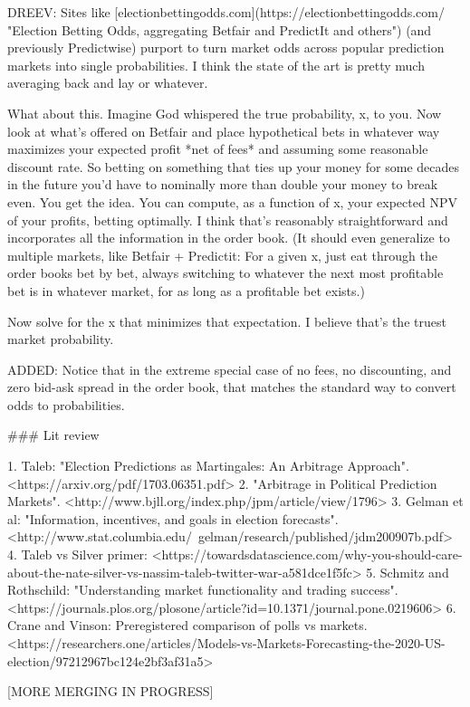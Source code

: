 \documentclass{article}
\begin{document}
\begin{markdown}

DREEV:
Sites like 
[electionbettingodds.com](https://electionbettingodds.com/ "Election Betting Odds, aggregating Betfair and PredictIt and others")
(and previously Predictwise)
purport to turn market odds across popular prediction markets into single probabilities.
I think the state of the art is pretty much averaging back and lay or whatever.

What about this.
Imagine God whispered the true probability, x, to you. 
Now look at what's offered on Betfair and place hypothetical bets in whatever way maximizes your expected profit *net of fees* and assuming some reasonable discount rate. 
So betting on something that ties up your money for some decades in the future you'd have to nominally more than double your money to break even. 
You get the idea. 
You can compute, as a function of x, your expected NPV of your profits, betting optimally. 
I think that's reasonably straightforward and incorporates all the information in the order book. 
(It should even generalize to multiple markets, like Betfair + Predictit: 
For a given x, just eat through the order books bet by bet, always switching to whatever the next most profitable bet is in whatever market, for as long as a profitable bet exists.)

Now solve for the x that minimizes that expectation. 
I believe that's the truest market probability.

ADDED: Notice that in the extreme special case of no fees, no discounting, and zero bid-ask spread in the order book, that matches the standard way to convert odds to probabilities.


### Lit review

1. Taleb: "Election Predictions as Martingales: An Arbitrage Approach".  
<https://arxiv.org/pdf/1703.06351.pdf>
2. "Arbitrage in Political Prediction Markets".   
<http://www.bjll.org/index.php/jpm/article/view/1796>
3. Gelman et al: "Information, incentives, and goals in election forecasts".  
<http://www.stat.columbia.edu/~gelman/research/published/jdm200907b.pdf>
4. Taleb vs Silver primer:  
<https://towardsdatascience.com/why-you-should-care-about-the-nate-silver-vs-nassim-taleb-twitter-war-a581dce1f5fc>
5. Schmitz and Rothschild: "Understanding market functionality and trading success".  
<https://journals.plos.org/plosone/article?id=10.1371/journal.pone.0219606>
6. Crane and Vinson: Preregistered comparison of polls vs markets.
<https://researchers.one/articles/Models-vs-Markets-Forecasting-the-2020-US-election/97212967bc124e2bf3af31a5>


[MORE MERGING IN PROGRESS]

\end{markdown}
\end{document}

